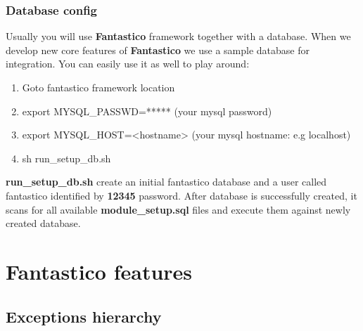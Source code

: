 \documentclass[letterpaper,10pt,english]{sphinxmanual}
\begin{document}
\subsection{Database config}
\label{get_started/dev_mode:database-config}
Usually you will use \textbf{Fantastico} framework together with a database. When we develop new core features of \textbf{Fantastico}
we use a sample database for integration. You can easily use it as well to play around:
\begin{enumerate}
\item {} 
Goto fantastico framework location

\item {} 
export MYSQL\_PASSWD=***** (your mysql password)

\item {} 
export MYSQL\_HOST=\textless{}hostname\textgreater{} (your mysql hostname: e.g localhost)

\item {} 
sh run\_setup\_db.sh

\end{enumerate}

\textbf{run\_setup\_db.sh} create an initial fantastico database and a user called fantastico identified by \textbf{12345} password. After
database is successfully created, it scans for all available \textbf{module\_setup.sql} files and execute them against newly created
database.


\chapter{Fantastico features}
\label{features/features::doc}\label{features/features:fantastico-features}

\section{Exceptions hierarchy}
\label{features/exceptions:exceptions-hierarchy}\label{features/exceptions::doc}
\end{document}
